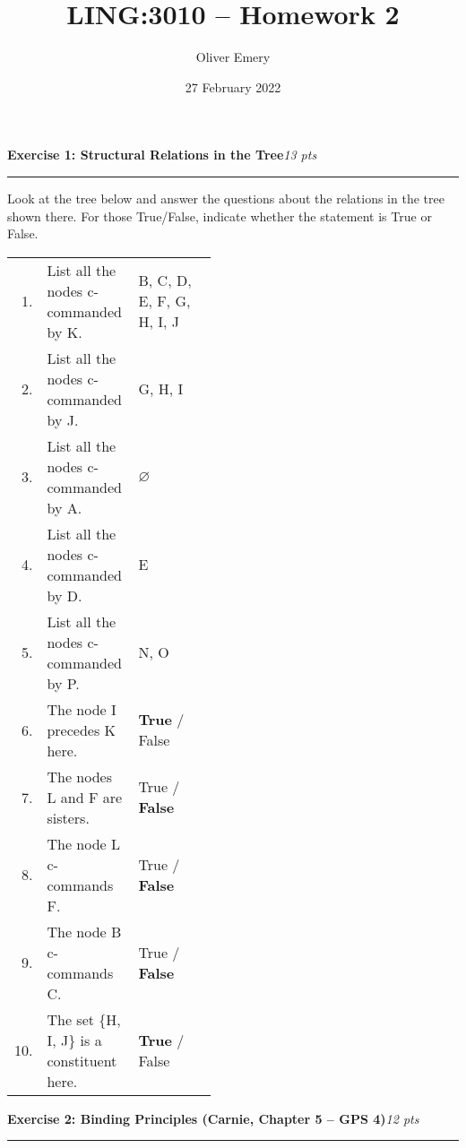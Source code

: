 \documentclass[12pt,letterpaper]{article}
\title{LING:3010 -- Homework 2}
\author{Oliver Emery}
\date{27 February 2022}
\newcommand{\rtrue}{\textbf{True}}
\newcommand{\rfalse}{\textbf{False}}
\newcommand{\wtrue}{\textcolor{gray!50}{True}}
\newcommand{\wfalse}{\textcolor{gray!50}{False}}
\newcommand{\exercise}[2]{
	\par{\large\bfseries #1}\hfill\emph{#2 pts}
	\par\vspace*{-2ex}\rule{\linewidth}{0.1pt}
	\par\vspace*{1.5ex}
}
\begin{document}
\maketitle

\exercise{Exercise 1: Structural Relations in the Tree}{13}

Look at the tree below and answer the questions about the relations in the tree
shown there. For those True/False, indicate whether the statement is True or
False.

\par\vspace*{3ex}
\hfill{}\hfill\null
\par\vspace*{3ex}

\quad\begin{tabular}[t]{r@{\hskip 8pt}p{0.45\linewidth}!{\color{gray!25}\vline}@{\hskip 1.3cm}l}
 1. & List all the nodes c-commanded by K.       & B, C, D, E, F, G, H, I, J \\
 2. & List all the nodes c-commanded by J.       & G, H, I \\
 3. & List all the nodes c-commanded by A.       & $\varnothing$ \\
 4. & List all the nodes c-commanded by D.       & E \\
 5. & List all the nodes c-commanded by P.       & N, O \\
 6. & The node I precedes K here.                & \rtrue{} / \wfalse \\
 7. & The nodes L and F are sisters.             & \wtrue{} / \rfalse \\
 8. & The node L c-commands F.                   & \wtrue{} / \rfalse \\
 9. & The node B c-commands C.                   & \wtrue{} / \rfalse \\
10. & The set \{H, I, J\} is a constituent here. & \rtrue{} / \wfalse
\end{tabular}

\newpage\exercise{Exercise 2: Binding Principles (Carnie, Chapter 5 -- GPS 4)}{12}
\end{document}
